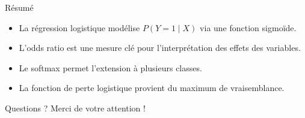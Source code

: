 \documentclass[aspectratio=169,12pt]{beamer}
\begin{document}
\begin{frame}{Résumé}
\begin{itemize}
  \item La régression logistique modélise $P(Y = 1 \mid X)$ via une fonction sigmoïde.
  \item L’odds ratio est une mesure clé pour l’interprétation des effets des variables.
  \item Le softmax permet l’extension à plusieurs classes.
  \item La fonction de perte logistique provient du maximum de vraisemblance.
\end{itemize}
\end{frame}

\begin{frame}{Questions ?}
\centering
\Huge Merci de votre attention !
\end{frame}
\end{document}
